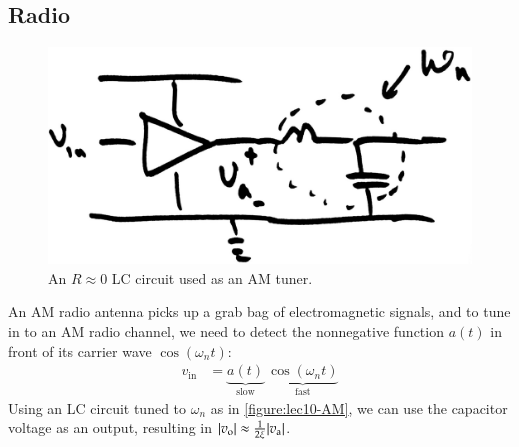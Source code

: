 \subsection{Radio}
\begin{figure}
  \centering
  \includegraphics[width=0.6\linewidth]{figures/10/AM}
  \caption{An \(R\approx 0\) LC circuit used as an AM tuner.}
  \label{figure:lec10-AM}
\end{figure}

An AM radio antenna picks up a grab bag of electromagnetic signals, and to tune in to an AM radio channel, we need to detect the nonnegative function \(a(t)\) in front of its carrier wave \(\cos(\omega_n t)\):
\begin{align}
  v_\text{in} &= \underbrace{a(t)}_{\text{slow}} \ \underbrace{\cos(\omega_n t)}_\text{fast}
\end{align}
Using an LC circuit tuned to \(\omega_n\) as in \autoref{figure:lec10-AM}, we can use the capacitor voltage as an output, resulting in \(\abs{v_\text{o}} \approx \frac{1}{2\xi} \abs{v_\text{a}}\).

